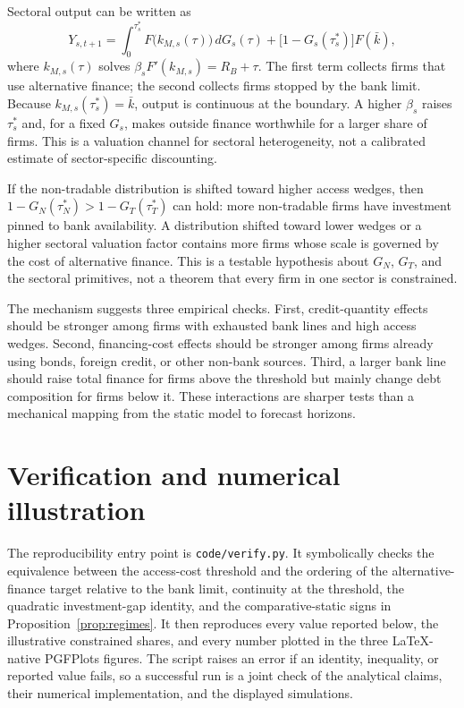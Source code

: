 \documentclass[11pt]{article}
\theoremstyle{definition}
\theoremstyle{remark}
\newcommand{\Rb}{R_B}
\begin{document}
Sectoral output can be written as
\begin{equation}\label{eq:aggregate}
Y_{s,t+1}
=\int_{0}^{\tau_s^*}F\bigl(k_{M,s}(\tau)\bigr)\,dG_s(\tau)
+\bigl[1-G_s(\tau_s^*)\bigr]F(\bar k),
\end{equation}
where $k_{M,s}(\tau)$ solves
$\beta_sF'(k_{M,s})=\Rb+\tau$.
The first term collects firms that use alternative finance; the second collects
firms stopped by the bank limit. Because
$k_{M,s}(\tau_s^*)=\bar k$, output is continuous at the boundary. A higher
$\beta_s$ raises $\tau_s^*$ and, for a fixed $G_s$, makes outside finance
worthwhile for a larger share of firms. This is a valuation channel for
sectoral heterogeneity, not a calibrated estimate of sector-specific
discounting.

If the non-tradable distribution is shifted toward higher access wedges, then
$1-G_N(\tau_N^*)>1-G_T(\tau_T^*)$ can hold: more non-tradable firms have
investment pinned to bank availability. A distribution shifted toward lower
wedges or a higher sectoral valuation factor contains more firms whose scale is
governed by the cost of alternative finance. This is a testable hypothesis
about $G_N$, $G_T$, and the sectoral primitives, not a theorem that every firm
in one sector is constrained.

The mechanism suggests three empirical checks. First, credit-quantity effects
should be stronger among firms with exhausted bank lines and high access
wedges. Second, financing-cost effects should be stronger among firms already
using bonds, foreign credit, or other non-bank sources. Third, a larger bank
line should raise total finance for firms above the threshold but mainly change
debt composition for firms below it. These interactions are sharper tests than
a mechanical mapping from the static model to forecast horizons.

\section{Verification and numerical illustration}

The reproducibility entry point is \texttt{code/verify.py}. It symbolically
checks the equivalence between the access-cost threshold and the ordering of
the alternative-finance target relative to the bank limit, continuity at the
threshold, the quadratic investment-gap identity, and the comparative-static
signs in Proposition~\ref{prop:regimes}. It then reproduces every value reported
below, the illustrative constrained shares, and every number plotted in the
three LaTeX-native PGFPlots figures. The script raises an error if an identity,
inequality, or reported value fails, so a successful run is a joint check of
the analytical claims, their numerical implementation, and the displayed
simulations.
\end{document}
